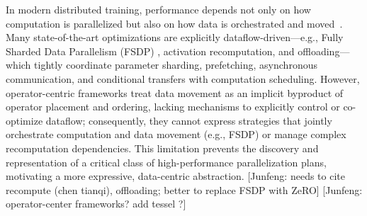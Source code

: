 \documentclass[letterpaper,twocolumn,10pt]{article}
\newcommand{\junfeng}[1]{{\color{blue}[Junfeng: #1]}}
\begin{document}
In modern distributed training, performance depends not only on how computation is parallelized but also on how data is orchestrated and moved~\cite{huang2019yugong, qiu2025moirai}. Many state-of-the-art optimizations are explicitly dataflow-driven—e.g., Fully Sharded Data Parallelism (FSDP) \cite{rajbhandari2020zero}, activation recomputation, and offloading—which tightly coordinate parameter sharding, prefetching, asynchronous communication, and conditional transfers with computation scheduling. However, operator-centric frameworks \cite{lin2024nnscaler} treat data movement as an implicit byproduct of operator placement and ordering, lacking mechanisms to explicitly control or co-optimize dataflow; consequently, they cannot express strategies that jointly orchestrate computation and data movement (e.g., FSDP) or manage complex recomputation dependencies. This limitation prevents the discovery and representation of a critical class of high-performance parallelization plans, motivating a more expressive, data-centric abstraction.
\junfeng{needs to cite recompute (chen tianqi), offloading; better to replace FSDP with ZeRO} 
\junfeng{operator-center frameworks?  add tessel ?} 


\end{document}
